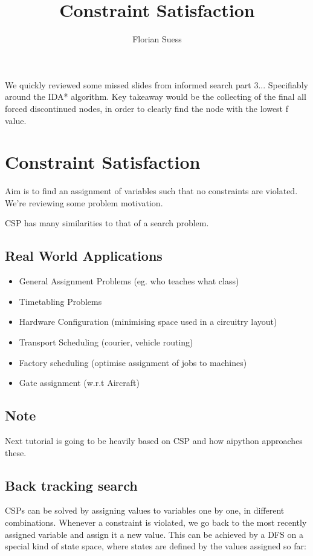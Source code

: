 \documentclass{article}
\begin{document}
\title{Constraint Satisfaction}
\date{}
\author{Florian Suess}
\maketitle
We quickly reviewed some missed slides from informed search part 3... Specifiably around the IDA* algorithm. Key takeaway would be the collecting of the final all forced discontinued nodes, in order to clearly find the node with the lowest f value.

\section{Constraint Satisfaction}
Aim is to find an assignment of variables such that no constraints are violated. We're reviewing some problem motivation.

CSP has many similarities to that of a search problem.

\subsection*{Real World Applications}

\begin{itemize}
	\item General Assignment Problems (eg. who teaches what class)
	\item Timetabling Problems
	\item Hardware Configuration (minimising space used in a circuitry layout)
	\item Transport Scheduling (courier, vehicle routing)
	\item Factory scheduling (optimise assignment of jobs to machines)
	\item Gate assignment (w.r.t Aircraft)
\end{itemize}

\subsection*{Note}
Next tutorial is going to be heavily based on CSP and how aipython approaches these.

\subsection{Back tracking search}
CSPs can be solved by assigning values to variables one by one, in different combinations. Whenever a constraint is violated, we go back to the most recently assigned variable and assign it a new value. This can be achieved by a DFS on a special kind of state space, where states are defined by the values assigned so far:
\end{document}
